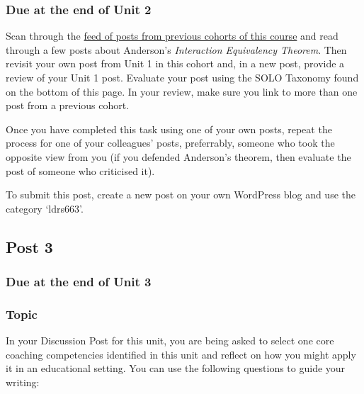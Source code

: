 \documentclass[
]{book}
\begin{document}
\hypertarget{due-at-the-end-of-unit-2}{%
\subsubsection*{Due at the end of Unit 2}\label{due-at-the-end-of-unit-2}}

Scan through the \href{https://ma-lead.github.io/ldrs663/past-blog-feeds.html}{feed of posts from previous cohorts of this course} and read through a few posts about Anderson's \emph{Interaction Equivalency Theorem}. Then revisit your own post from Unit 1 in this cohort and, in a new post, provide a review of your Unit 1 post. Evaluate your post using the SOLO Taxonomy found on the bottom of this page. In your review, make sure you link to more than one post from a previous cohort.

Once you have completed this task using one of your own posts, repeat the process for one of your colleagues' posts, preferrably, someone who took the opposite view from you (if you defended Anderson's theorem, then evaluate the post of someone who criticised it).

To submit this post, create a new post on your own WordPress blog and use the category `ldrs663'.

\hypertarget{post-3}{%
\subsection*{Post 3}\label{post-3}}

\hypertarget{due-at-the-end-of-unit-3}{%
\subsubsection*{Due at the end of Unit 3}\label{due-at-the-end-of-unit-3}}

\hypertarget{topic-1}{%
\subsubsection*{Topic}\label{topic-1}}

In your Discussion Post for this unit, you are being asked to select one core coaching competencies identified in this unit and reflect on how you might apply it in an educational setting. You can use the following questions to guide your writing:
\end{document}

